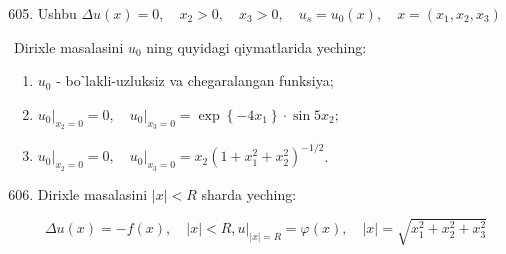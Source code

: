 \documentclass[10pt]{article}
\begin{document}
\begin{enumerate}
  \setcounter{enumi}{604}
  \item Ushbu $\Delta u(x)=0, \quad x_{2}>0, \quad x_{3}>0, \quad u_{s}=u_{0}(x), \quad x=\left(x_{1}, x_{2}, x_{3}\right)$
\end{enumerate}

Dirixle masalasini $u_{0}$ ning quyidagi qiymatlarida yeching:

\begin{enumerate}
  \item $u_{0}$ - boˋlakli-uzluksiz va chegaralangan funksiya;
  \item $\left.u_{0}\right|_{x_{2}=0}=0,\left.\quad u_{0}\right|_{x_{3}=0}=\exp \left\{-4 x_{1}\right\} \cdot \sin 5 x_{2}$;
  \item $\left.u_{0}\right|_{x_{2}=0}=0,\left.\quad u_{0}\right|_{x_{3}=0}=x_{2}\left(1+x_{1}^{2}+x_{2}^{2}\right)^{-1 / 2}$.
\end{enumerate}

\begin{enumerate}
  \setcounter{enumi}{605}
  \item Dirixle masalasini $|x|<R$ sharda yeching:
\end{enumerate}

$$
\Delta u(x)=-f(x), \quad|x|<R,\left.u\right|_{|x|=R}=\varphi(x), \quad|x|=\sqrt{x_{1}^{2}+x_{2}^{2}+x_{3}^{2}}
$$
\end{document}
